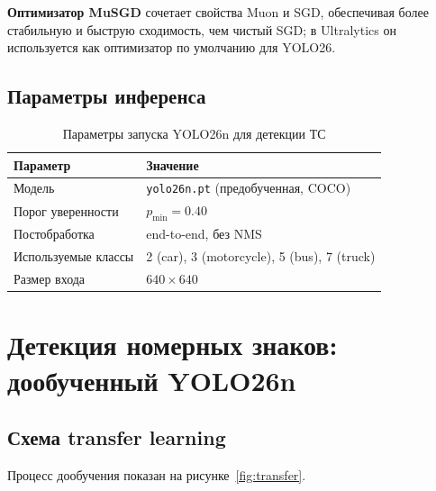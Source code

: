 \documentclass[10pt,a4paper]{report}
\numberwithin{equation}{chapter}
\numberwithin{figure}{chapter}
\numberwithin{table}{chapter}
\begin{document}
\textbf{Оптимизатор MuSGD} сочетает свойства Muon и SGD, обеспечивая
более стабильную и быструю сходимость, чем чистый SGD; в Ultralytics он
используется как оптимизатор по умолчанию для YOLO26.

\subsection{Параметры инференса}

\begin{table}[H]
\centering
\caption{Параметры запуска YOLO26n для детекции ТС}
\label{tab:yolo_params}
\begin{tabularx}{\textwidth}{lX}
\toprule
\textbf{Параметр} & \textbf{Значение} \\
\midrule
Модель                  & \texttt{yolo26n.pt} (предобученная, COCO) \\
Порог уверенности       & $p_{\min} = 0.40$ \\
Постобработка           & end-to-end, без NMS \\
Используемые классы     & 2 (car), 3 (motorcycle), 5 (bus), 7 (truck) \\
Размер входа            & $640 \times 640$ \\
\bottomrule
\end{tabularx}
\end{table}

\section{Детекция номерных знаков: дообученный YOLO26n}

\subsection{Схема transfer learning}

Процесс дообучения показан на рисунке~\ref{fig:transfer}.
\end{document}
